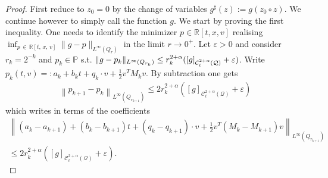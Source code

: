 \documentclass[AHL,Unicode,longabstracts,published]{cedram}
\newcommand{\R}{\mathbb{R}}
\newcommand{\bbP}{\mathbb{P}}
\newcommand{\cC}{\mathcal{C}}
\newcommand{\cQ}{\mathcal{Q}}
\newcommand*\eps{\varepsilon}
\begin{document}
\begin{proof}
First reduce to $z_0=0$ by the change of variables $g^\sharp(z) := g(z_0 \circ z)$. We continue however to simply call the function $g$. We start by proving the first inequality. One needs to identify the minimizer $p \in \R[t,x,v]$ realising $\inf_{p\,\in\,\R[t,\,x,\,v]} \|g-p \|_{L^\infty(Q_r)}$ in the limit $r \to 0^+$. Let $\eps >0$ and consider $r_k = 2^{-k}$ and $p_k \in \bbP$ s.t. $\|g-p_k \|_{L^\infty(Q_{r_k})}\linebreak\le r_k^{2+\alpha}([g]_{\cC_\ell^{2+\alpha}(\cQ)} + \eps)$. Write $p_k(t,v) =: a_k + b_k t + q_k \cdot v + \frac12 v^T M_k v$. By subtraction one gets
\begin{align*}
\left\| p_{k+1}-p_{k} \right\|_{L^\infty\left(Q_{r_{k+1}}\right)} \le 2 r_k^{2+\alpha} \left([g]_{\cC_\ell^{2+\alpha}(\cQ)}+\eps \right)
\end{align*}
which writes in terms of the coefficients
\begin{align*}
\left\| \left(a_{k}-a_{k+1}\right) + \left(b_{k} - b_{k+1}
\right) t + \left(q_{k} - q_{k+1} \right) \cdot v + \frac12 v^T
\left(M_{k} - M_{k+1} \right) v
\right\|_{L^\infty\left(Q_{r_{k+1}}\right)} \\
\le 2 r_{k}^{2+\alpha} \left([g]_{\cC_\ell^{2+\alpha}(\cQ)} + \eps \right).
\end{align*}



\end{proof}
\end{document}
